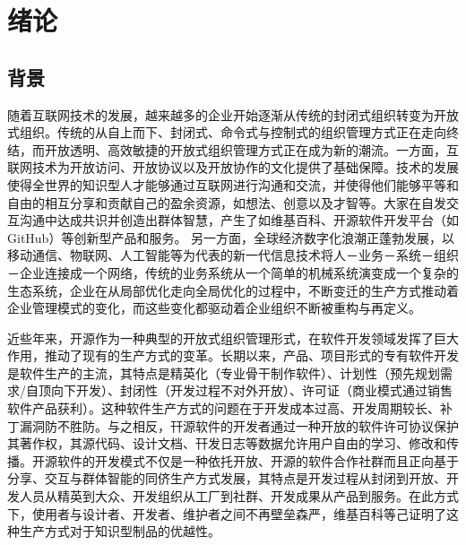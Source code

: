 
\section{绪论}
 
\subsection{背景}
\par 随着互联网技术的发展，越来越多的企业开始逐渐从传统的封闭式组织转变为开放式组织。传统的从自上而下、封闭式、命令式与控制式的组织管理方式正在走向终结，而开放透明、高效敏捷的开放式组织管理方式正在成为新的潮流。一方面，互联网技术为开放访问、开放协议以及开放协作的文化提供了基础保障。技术的发展使得全世界的知识型人才能够通过互联网进行沟通和交流，并使得他们能够平等和自由的相互分享和贡献自己的盈余资源，如想法、创意以及才智等。大家在自发交互沟通中达成共识并创造出群体智慧，产生了如维基百科、开源软件开发平台（如GitHub）等创新型产品和服务\cite{王璐2017开放式创新的协同演化机制研究}。 另一方面，全球经济数字化浪潮正蓬勃发展，以移动通信、物联网、人工智能等为代表的新一代信息技术将人－业务－系统－组织－企业连接成一个网络，传统的业务系统从一个简单的机械系统演变成一个复杂的生态系统，企业在从局部优化走向全局优化的过程中，不断变迁的生产方式推动着企业管理模式的变化，而这些变化都驱动着企业组织不断被重构与再定义。

\par 近些年来，开源作为一种典型的开放式组织管理形式，在软件开发领域发挥了巨大作用，推动了现有的生产方式的变革。长期以来，产品、项目形式的专有软件开发是软件生产的主流，其特点是精英化（专业骨干制作软件）、计划性（预先规划需求/自顶向下开发）、封闭性（开发过程不对外开放）、许可证（商业模式通过销售软件产品获利）。这种软件生产方式的问题在于开发成本过高、开发周期较长、补丁漏洞防不胜防。与之相反，幵源软件的开发者通过一种开放的软件许可协议保护其著作权，其源代码、设计文档、幵发日志等数据允许用户自由的学习、修改和传播。开源软件的开发模式不仅是一种依托开放、开源的软件合作社群而且正向基于分享、交互与群体智能的同侪生产方式发展，其特点是开发过程从封闭到开放、开发人员从精英到大众、开发组织从工厂到社群、开发成果从产品到服务。在此方式下，使用者与设计者、开发者、维护者之间不再壁垒森严，维基百科等己证明了这种生产方式对于知识型制品的优越性。\cite{李其锋2014面向开源社区的开发者群体行为分析方法}

